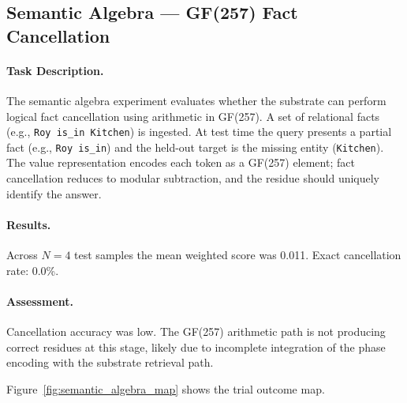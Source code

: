 \subsection{Semantic Algebra --- GF(257) Fact Cancellation}
\label{sec:semantic_algebra}

\paragraph{Task Description.}
The semantic algebra experiment evaluates whether the substrate can perform
logical fact cancellation using arithmetic in GF(257).  A set of relational
facts (e.g., \texttt{Roy is\_in Kitchen}) is ingested. At test time the
query presents a partial fact (e.g., \texttt{Roy is\_in}) and the held-out
target is the missing entity (\texttt{Kitchen}).  The value representation
encodes each token as a GF(257) element; fact cancellation reduces to
modular subtraction, and the residue should uniquely identify the answer.

\paragraph{Results.}
Across $N = 4$ test samples the mean weighted score was 0.011.
Exact cancellation rate: 0.0\%.

\paragraph{Assessment.}
Cancellation accuracy was low.  The GF(257) arithmetic path is not
producing correct residues at this stage, likely due to incomplete
integration of the phase encoding with the substrate retrieval path.

Figure~\ref{fig:semantic_algebra_map} shows the trial outcome map.
